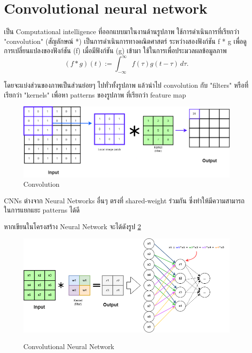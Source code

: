 \section{Convolutional neural network}
เป็น Computational intelligence ที่ออกแบบมาในงานด้านรูปภาพ
ใช้การดำเนินการที่เรียกว่า "convolution"  (สัญลักษณ์ *) เป็นการดำเนินการทางคณิตศาสตร์ ระหว่างสองฟังก์ชัน f * g เพื่อดูการเปลี่ยนแปลงของฟังก์ชัน (f) เมื่อมีฟังก์ชัน (g) เข้ามา
ใช้ในการเพื่อประมวลผลข้อมูลภาพ
\begin{equation}
  {\displaystyle (f*g)(t):=\int _{-\infty }^{\infty }f(\tau )g(t-\tau )\,d\tau .}
\end{equation}

โดยจะแบ่งส่วนของภาพเป็นส่วนย่อยๆ ไปทั่วทั้งรูปภาพ แล้วนำไป convolution กับ  "filters" หรือที่เรียกว่า "kernels" เพื่อหา patterns ของรูปภาพ ที่เรียกว่า feature map
\begin{figure}[h]
  \begin{center}

    \includegraphics[scale=0.35]{pic/model/cnn_1.png}
  \end{center}
  \caption[Convolution]{Convolution}
  \label{fig:Convolution }
\end{figure}


CNNs ต่างจาก Neural Networks อื่นๆ ตรงที่  shared-weight ร่วมกัน ซึ่งทำให้มีความสามารถในการแยกแยะ patterns ได้ดี


หากเขียนในโครงสร้าง Neural Network จะได้ดังรูป \ref{fig:Convolutional Neural Network}
\begin{figure}[h]
  \begin{center}

    \includegraphics[scale=0.35]{pic/model/cnn_nn_1.png}\cite{CNN_mlp}
  \end{center}

  \caption[Convolutional Neural Network]{Convolutional Neural Network}
  \label{fig:Convolutional Neural Network}
\end{figure}



